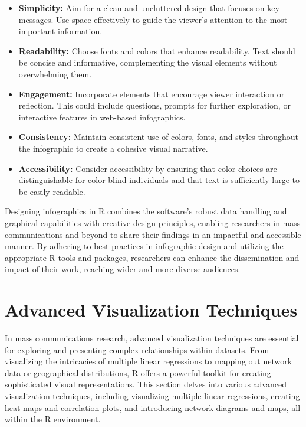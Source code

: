 \documentclass[
]{book}
\begin{document}
\begin{itemize}
\item
  \textbf{Simplicity:} Aim for a clean and uncluttered design that focuses on key messages. Use space effectively to guide the viewer's attention to the most important information.
\item
  \textbf{Readability:} Choose fonts and colors that enhance readability. Text should be concise and informative, complementing the visual elements without overwhelming them.
\item
  \textbf{Engagement:} Incorporate elements that encourage viewer interaction or reflection. This could include questions, prompts for further exploration, or interactive features in web-based infographics.
\item
  \textbf{Consistency:} Maintain consistent use of colors, fonts, and styles throughout the infographic to create a cohesive visual narrative.
\item
  \textbf{Accessibility:} Consider accessibility by ensuring that color choices are distinguishable for color-blind individuals and that text is sufficiently large to be easily readable.
\end{itemize}

Designing infographics in R combines the software's robust data handling and graphical capabilities with creative design principles, enabling researchers in mass communications and beyond to share their findings in an impactful and accessible manner. By adhering to best practices in infographic design and utilizing the appropriate R tools and packages, researchers can enhance the dissemination and impact of their work, reaching wider and more diverse audiences.

\hypertarget{advanced-visualization-techniques}{%
\section{Advanced Visualization Techniques}\label{advanced-visualization-techniques}}

In mass communications research, advanced visualization techniques are essential for exploring and presenting complex relationships within datasets. From visualizing the intricacies of multiple linear regressions to mapping out network data or geographical distributions, R offers a powerful toolkit for creating sophisticated visual representations. This section delves into various advanced visualization techniques, including visualizing multiple linear regressions, creating heat maps and correlation plots, and introducing network diagrams and maps, all within the R environment.
\end{document}
